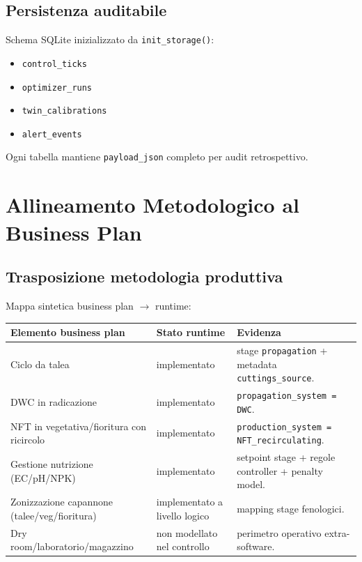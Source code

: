﻿\documentclass[11pt,a4paper]{report}
\begin{document}
\section{Persistenza auditabile}
Schema SQLite inizializzato da \texttt{init\_storage()}:
\begin{itemize}
  \item \texttt{control\_ticks}
  \item \texttt{optimizer\_runs}
  \item \texttt{twin\_calibrations}
  \item \texttt{alert\_events}
\end{itemize}
Ogni tabella mantiene \texttt{payload\_json} completo per audit retrospettivo.

\newpage
\chapter{Allineamento Metodologico al Business Plan}

\section{Trasposizione metodologia produttiva}
Mappa sintetica business plan \(\rightarrow\) runtime:
\begin{longtable}{@{}p{5.0cm}p{3.4cm}p{4.8cm}@{}}
\toprule
Elemento business plan & Stato runtime & Evidenza \\ \midrule
Ciclo da talea & implementato & stage \texttt{propagation} + metadata \texttt{cuttings\_source}. \\
DWC in radicazione & implementato & \texttt{propagation\_system = DWC}. \\
NFT in vegetativa/fioritura con ricircolo & implementato & \texttt{production\_system = NFT\_recirculating}. \\
Gestione nutrizione (EC/pH/NPK) & implementato & setpoint stage + regole controller + penalty model. \\
Zonizzazione capannone (talee/veg/fioritura) & implementato a livello logico & mapping stage fenologici. \\
Dry room/laboratorio/magazzino & non modellato nel controllo & perimetro operativo extra-software. \\
\bottomrule
\end{longtable}
\end{document}
